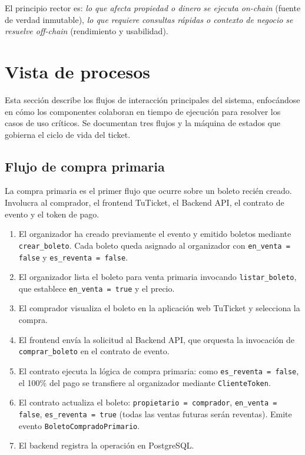 \documentclass[12pt,oneside]{article}
\begin{document}
El principio rector es: \textit{lo que afecta propiedad o dinero se ejecuta on-chain} (fuente de verdad inmutable), \textit{lo que requiere consultas rápidas o contexto de negocio se resuelve off-chain} (rendimiento y usabilidad).

\FloatBarrier
\clearpage
\section{Vista de procesos}
\label{sec:vista-procesos}

Esta sección describe los flujos de interacción principales del sistema, enfocándose en cómo los componentes colaboran en tiempo de ejecución para resolver los casos de uso críticos. Se documentan tres flujos y la máquina de estados que gobierna el ciclo de vida del ticket.

\subsection{Flujo de compra primaria}

La compra primaria es el primer flujo que ocurre sobre un boleto recién creado. Involucra al comprador, el frontend TuTicket, el Backend API, el contrato de evento y el token de pago.

\begin{enumerate}
  \item El organizador ha creado previamente el evento y emitido boletos mediante \texttt{crear\_boleto}. Cada boleto queda asignado al organizador con \texttt{en\_venta = false} y \texttt{es\_reventa = false}.
  \item El organizador lista el boleto para venta primaria invocando \texttt{listar\_boleto}, que establece \texttt{en\_venta = true} y el precio.
  \item El comprador visualiza el boleto en la aplicación web TuTicket y selecciona la compra.
  \item El frontend envía la solicitud al Backend API, que orquesta la invocación de \texttt{comprar\_boleto} en el contrato de evento.
  \item El contrato ejecuta la lógica de compra primaria: como \texttt{es\_reventa = false}, el 100\% del pago se transfiere al organizador mediante \texttt{ClienteToken}.
  \item El contrato actualiza el boleto: \texttt{propietario = comprador}, \texttt{en\_venta = false}, \texttt{es\_reventa = true} (todas las ventas futuras serán reventas). Emite evento \texttt{BoletoCompradoPrimario}.
  \item El backend registra la operación en PostgreSQL.
\end{enumerate}
\end{document}
